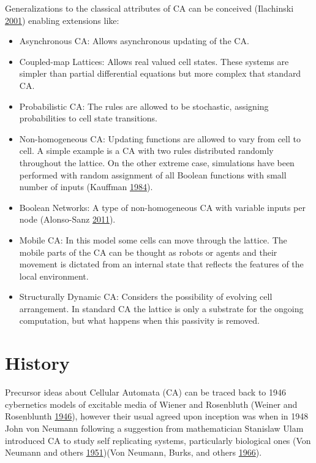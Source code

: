 \documentclass[
  openany]{book}
\begin{document}
Generalizations to the classical attributes of CA can be conceived (Ilachinski \protect\hyperlink{ref-ilachinski2001cellular}{2001}) enabling extensions like:

\begin{itemize}
\item
  Asynchronous CA:
  Allows asynchronous updating of the CA.
\item
  Coupled-map Lattices:
  Allows real valued cell states. These systems are simpler than partial differential equations but more complex that standard CA.
\item
  Probabilistic CA:
  The rules are allowed to be stochastic, assigning probabilities to cell state transitions.
\item
  Non-homogeneous CA:
  Updating functions are allowed to vary from cell to cell. A simple example is a CA with two rules distributed randomly throughout the lattice. On the other extreme case, simulations have been performed with random assignment of all Boolean functions with small number of inputs (Kauffman \protect\hyperlink{ref-kauffman1984emergent}{1984}).
\item
  Boolean Networks:
  A type of non-homogeneous CA with variable inputs per node (Alonso-Sanz \protect\hyperlink{ref-alonso2011discrete}{2011}).
\item
  Mobile CA:
  In this model some cells can move through the lattice. The mobile parts of the CA can be thought as robots or agents and their movement is dictated from an internal state that reflects the features of the local environment.
\item
  Structurally Dynamic CA:
  Considers the possibility of evolving cell arrangement. In standard CA the lattice is only a substrate for the ongoing computation, but what happens when this passivity is removed.
\end{itemize}

\hypertarget{history}{%
\section{History}\label{history}}

Precursor ideas about Cellular Automata (CA) can be traced back to 1946 cybernetics models of excitable media of Wiener and Rosenbluth (Weiner and Rosenblunth \protect\hyperlink{ref-weiner1946mathematical}{1946}), however their usual agreed upon inception was when in 1948 John von Neumann following a suggestion from mathematician Stanislaw Ulam introduced CA to study self replicating systems, particularly biological ones (Von Neumann and others \protect\hyperlink{ref-von1951general}{1951})(Von Neumann, Burks, and others \protect\hyperlink{ref-von1966theory}{1966}).
\end{document}
